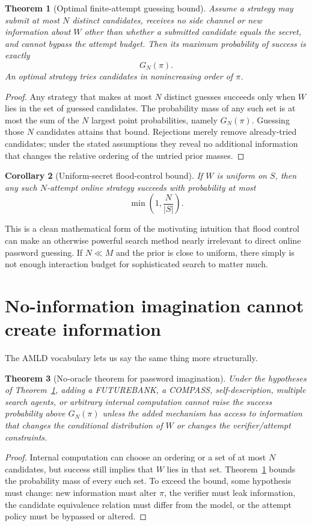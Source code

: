 \documentclass[11pt,openany]{book}
\newtheorem{theorem}{Theorem}[chapter]
\newtheorem{corollary}[theorem]{Corollary}
\theoremstyle{definition}
\theoremstyle{remark}
\begin{document}
\begin{theorem}[Optimal finite-attempt guessing bound]\label{thm:topN}
Assume a strategy may submit at most $N$ distinct candidates, receives no side channel or new information about $W$ other than whether a submitted candidate equals the secret, and cannot bypass the attempt budget. Then its maximum probability of success is exactly
\[
G_N(\pi).
\]
An optimal strategy tries candidates in nonincreasing order of $\pi$.
\end{theorem}
\begin{proof}
Any strategy that makes at most $N$ distinct guesses succeeds only when $W$ lies in the set of guessed candidates. The probability mass of any such set is at most the sum of the $N$ largest point probabilities, namely $G_N(\pi)$. Guessing those $N$ candidates attains that bound. Rejections merely remove already-tried candidates; under the stated assumptions they reveal no additional information that changes the relative ordering of the untried prior masses.
\end{proof}

\begin{corollary}[Uniform-secret flood-control bound]\label{cor:uniformN}
If $W$ is uniform on $S$, then any such $N$-attempt online strategy succeeds with probability at most
\[
\min\left(1,\frac{N}{|S|}\right).
\]
\end{corollary}

This is a clean mathematical form of the motivating intuition that flood control can make an otherwise powerful search method nearly irrelevant to direct online password guessing. If $N\ll M$ and the prior is close to uniform, there simply is not enough interaction budget for sophisticated search to matter much.

\section{No-information imagination cannot create information}
The AMLD vocabulary lets us say the same thing more structurally.

\begin{theorem}[No-oracle theorem for password imagination]\label{thm:nooracle}
Under the hypotheses of Theorem~\ref{thm:topN}, adding a FUTUREBANK, a COMPASS, self-description, multiple search agents, or arbitrary internal computation cannot raise the success probability above $G_N(\pi)$ unless the added mechanism has access to information that changes the conditional distribution of $W$ or changes the verifier/attempt constraints.
\end{theorem}
\begin{proof}
Internal computation can choose an ordering or a set of at most $N$ candidates, but success still implies that $W$ lies in that set. Theorem~\ref{thm:topN} bounds the probability mass of every such set. To exceed the bound, some hypothesis must change: new information must alter $\pi$, the verifier must leak information, the candidate equivalence relation must differ from the model, or the attempt policy must be bypassed or altered.
\end{proof}
\end{document}
